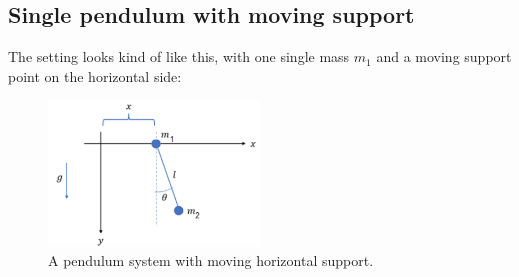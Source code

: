 \subsection{Single pendulum with moving support}
The setting looks kind of like this, with one single mass $m_{1}$ and a moving support point on the horizontal side: 
\begin{figure}[htb]
    \centering
    \includegraphics[width=0.5\textwidth]{img/pendulumsupport.png}
    \caption{
        A pendulum system with moving horizontal support. 
    }
\end{figure}

